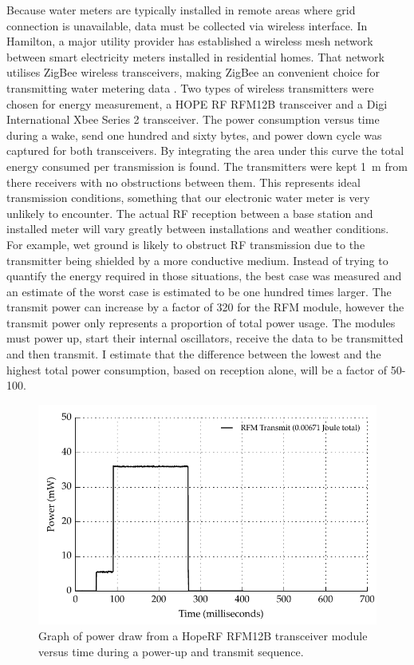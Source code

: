     Because water meters are typically installed in remote areas where grid connection is unavailable, data must be collected via wireless interface.
    In Hamilton, a major utility provider has established a wireless mesh network between smart electricity meters installed in residential homes.
    That network utilises ZigBee wireless transceivers, making ZigBee an convenient choice for transmitting water metering data \cite{MalcolmSouness-WELNetworks2012}.
    Two types of wireless transmitters were chosen for energy measurement, a HOPE RF RFM12B transceiver and a Digi International Xbee Series 2 transceiver.
    The power consumption versus time during a wake, send one hundred and sixty bytes, and power down cycle was captured for both transceivers.
    By integrating the area under this curve the total energy consumed per transmission is found.
    The transmitters were kept \SI{1}{\meter} from there receivers with no obstructions between them.
    This represents ideal transmission conditions, something that our electronic water meter is very unlikely to encounter.
    The actual RF reception between a base station and installed meter will vary greatly between installations and weather conditions.
    For example, wet ground is likely to obstruct RF transmission due to the transmitter being shielded by a more conductive medium.
    Instead of trying to quantify the energy required in those situations, the best case was measured and an estimate of the worst case is estimated to be one hundred times larger.
    The transmit power can increase by a factor of 320 for the RFM module, however the transmit power only represents a proportion of total power usage.
    The modules must power up, start their internal oscillators, receive the data to be transmitted and then transmit.
    I estimate that the difference between the lowest and the highest total power consumption, based on reception alone, will be a factor of 50-100.

    \begin{figure}
      \centering
      \includegraphics{content/pt1/03-EnergyRequirements/graphics/Graph_RFMPower.pdf}
      \caption{\label{fig:Energy-consumed-RFM12B}Graph of power draw from a HopeRF RFM12B transceiver module versus time during a power-up and transmit sequence.}
    \end{figure}

